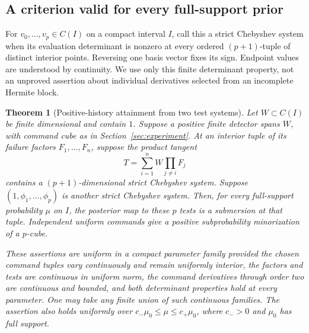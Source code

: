 \documentclass[11pt]{amsart}
\newtheorem{theorem}{Theorem}[section]
\theoremstyle{definition}\newtheorem{definition}[theorem]{Definition}
\theoremstyle{remark}\newtheorem{remark}[theorem]{Remark}
\begin{document}
\subsection{A criterion valid for every full-support prior}
For $v_0,\ldots,v_p\in C(I)$ on a compact interval $I$, call this a strict Chebyshev
system when its evaluation determinant is nonzero at every ordered
$(p+1)$-tuple of distinct interior points. Reversing one basis vector
fixes its sign. Endpoint values are understood by continuity. We use
only this finite determinant property, not an unproved assertion about
individual derivatives selected from an incomplete Hermite block.

\begin{theorem}[Positive-history attainment from two test systems]
\label{thm:positive-attainment}
Let $W\subset C(I)$ be finite dimensional and contain $1$. Suppose a
positive finite detector spans $W$, with command cube as in
Section~\ref{sec:experiment}. At an interior tuple of its failure factors
$F_1,\ldots,F_n$, suppose the product tangent
\[
 T=\sum_{i=1}^n W\prod_{j\ne i}F_j
\]
contains a $(p+1)$-dimensional strict Chebyshev system. Suppose
$(1,\phi_1,\ldots,\phi_p)$ is another strict Chebyshev system. Then,
for every full-support probability $\mu$ on $I$, the posterior map to
these $p$ tests is a submersion at that tuple. Independent uniform
commands give a positive subprobability minorization of a $p$-cube.

These assertions are uniform in a compact parameter family provided the
chosen command tuples vary continuously and remain uniformly interior,
the factors and tests are continuous in
uniform norm, the command derivatives through order two are continuous
and bounded, and both determinant properties hold at every parameter.
One may take any finite union of such continuous families. The assertion
also holds uniformly over $c_-\mu_0\le\mu\le c_+\mu_0$, where $c_->0$
and $\mu_0$ has full support.
\end{theorem}
\end{document}
